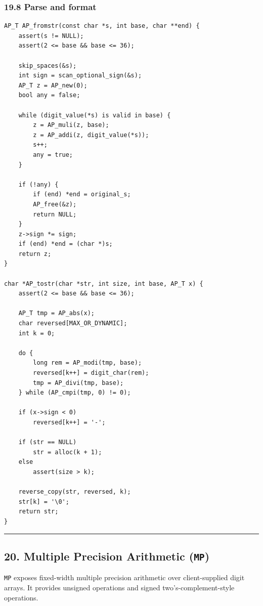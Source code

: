 \documentclass[11pt]{article}
\begin{document}
\subsubsection{19.8 Parse and format}\label{parse-and-format}

\begin{verbatim}
AP_T AP_fromstr(const char *s, int base, char **end) {
    assert(s != NULL);
    assert(2 <= base && base <= 36);

    skip_spaces(&s);
    int sign = scan_optional_sign(&s);
    AP_T z = AP_new(0);
    bool any = false;

    while (digit_value(*s) is valid in base) {
        z = AP_muli(z, base);
        z = AP_addi(z, digit_value(*s));
        s++;
        any = true;
    }

    if (!any) {
        if (end) *end = original_s;
        AP_free(&z);
        return NULL;
    }
    z->sign *= sign;
    if (end) *end = (char *)s;
    return z;
}

char *AP_tostr(char *str, int size, int base, AP_T x) {
    assert(2 <= base && base <= 36);

    AP_T tmp = AP_abs(x);
    char reversed[MAX_OR_DYNAMIC];
    int k = 0;

    do {
        long rem = AP_modi(tmp, base);
        reversed[k++] = digit_char(rem);
        tmp = AP_divi(tmp, base);
    } while (AP_cmpi(tmp, 0) != 0);

    if (x->sign < 0)
        reversed[k++] = '-';

    if (str == NULL)
        str = alloc(k + 1);
    else
        assert(size > k);

    reverse_copy(str, reversed, k);
    str[k] = '\0';
    return str;
}
\end{verbatim}

\begin{center}\rule{0.5\linewidth}{0.5pt}\end{center}

\subsection{\texorpdfstring{20. Multiple Precision Arithmetic (\texttt{MP})}{20. Multiple Precision Arithmetic (MP)}}\label{multiple-precision-arithmetic-mp}

\texttt{MP} exposes fixed-width multiple precision arithmetic over client-supplied digit arrays. It provides unsigned operations and signed two's-complement-style operations.
\end{document}

